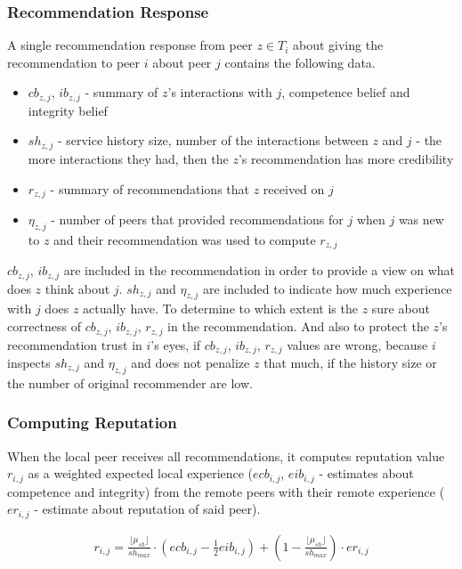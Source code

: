 \subsubsection{Recommendation Response}
A single recommendation response from peer $z \in T_{i}$ about giving the recommendation to peer $i$ about peer $j$ contains the following data.
\begin{itemize}
    \item $cb_{z,j}$, $ib_{z,j}$ - summary of $z$'s interactions with $j$, competence belief and integrity belief
    \item $sh_{z,j}$ - service history size, number of the interactions between $z$ and $j$ - the more interactions they had, then the $z$'s recommendation has more credibility
    \item $r_{z, j}$ - summary of recommendations that $z$ received on $j$
    \item $\eta_{z,j}$ - number of peers that provided recommendations for $j$ when $j$ was new to $z$ and their recommendation was used to compute $r_{z,j}$
\end{itemize}

$cb_{z,j}$, $ib_{z,j}$ are included in the recommendation in order to provide a view on what does $z$ think about $j$.
$sh_{z,j}$ and $\eta_{z,j}$ are included to indicate how much experience with $j$ does $z$ actually have. To determine to which extent is the $z$ sure about correctness of $cb_{z,j}$, $ib_{z,j}$, $r_{z, j}$ in the recommendation.
And also to protect the $z$'s recommendation trust in $i$'s eyes, if $cb_{z,j}$, $ib_{z,j}$, $r_{z, j}$ values are wrong, because $i$ inspects $sh_{z,j}$ and $\eta_{z,j}$ and does not penalize $z$ that much, if the history size or the number of original recommender are low.

\subsubsection{Computing Reputation}
\label{subsubsec:computing-reputation}
When the local peer receives all recommendations, it computes reputation value $r_{i,j}$ as a weighted expected local experience ($ecb_{i,j}$, $eib_{i,j}$ - estimates about competence and integrity) from the remote peers with their remote experience ($er_{i,j}$ - estimate about reputation of said peer).

\begin{equation}
\label{eq:reputation-value}
\begin{split}
    r_{i, j}=\frac{\lfloor\mu_{sh}\rfloor}{sh_{max}} \cdot \left(ecb_{i,j}-\frac{1}{2} eib_{i, j}\right) + \left(1-\frac{\lfloor\mu_{sh}\rfloor}{sh_{max}}\right) \cdot er_{i,j}
\end{split}
\end{equation}

